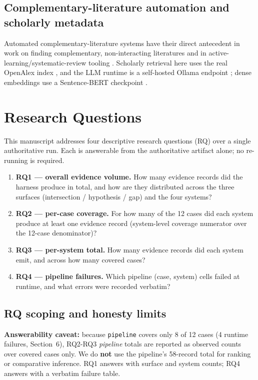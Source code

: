 \documentclass[11pt]{article}
\begin{document}
\subsection{Complementary-literature automation and scholarly metadata}
Automated complementary-literature systems have their direct antecedent in work
on finding complementary, non-interacting literatures \citep{swanson1997} and in
active-learning/systematic-review tooling \citep{settles2009al}. Scholarly
retrieval here uses the real OpenAlex index \citep{priem2022openalex}, and the
LLM runtime is a self-hosted Ollama endpoint \citep{ollama}; dense embeddings use
a Sentence-BERT checkpoint \citep{sbert}.

\section{Research Questions}
\label{sec:rq}
This manuscript addresses four descriptive research questions (RQ) over a single
authoritative run. Each is answerable from the authoritative artifact alone; no
re-running is required.

\begin{enumerate}
\item \textbf{RQ1 --- overall evidence volume.} How many evidence records did the
      harness produce in total, and how are they distributed across the three
      surfaces (intersection / hypothesis / gap) and the four systems?
\item \textbf{RQ2 --- per-case coverage.} For how many of the 12 cases did each
      system produce at least one evidence record (system-level coverage
      numerator over the 12-case denominator)?
\item \textbf{RQ3 --- per-system total.} How many evidence records did each
      system emit, and across how many covered cases?
\item \textbf{RQ4 --- pipeline failures.} Which pipeline (case, system) cells
      failed at runtime, and what errors were recorded verbatim?
\end{enumerate}

\subsection{RQ scoping and honesty limits}
\textbf{Answerability caveat:} because \texttt{pipeline} covers only 8 of 12
cases (4 runtime failures, Section~6), RQ2-RQ3 \emph{pipeline} totals are
reported as observed counts over covered cases only. We do \textbf{not} use the
pipeline's 58-record total for ranking or comparative inference. RQ1 answers with
surface and system counts; RQ4 answers with a verbatim failure table.
\end{document}

